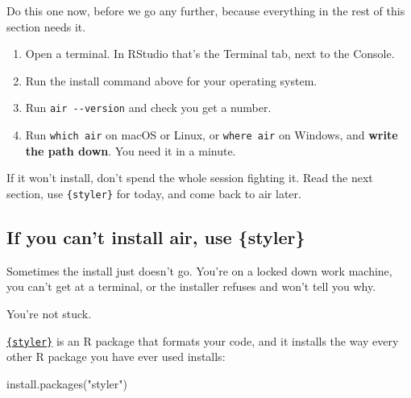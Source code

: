 \documentclass[
  letterpaper,
  justified,
  a4paper]{tufte-book}
\makeatletter
\newenvironment{Shaded}{\begin{snugshade}}{\end{snugshade}}
\newcommand{\FunctionTok}[1]{\textcolor[rgb]{0.28,0.35,0.67}{#1}}
\newcommand{\NormalTok}[1]{\textcolor[rgb]{0.00,0.23,0.31}{#1}}
\newcommand{\StringTok}[1]{\textcolor[rgb]{0.13,0.47,0.30}{#1}}
\providecommand{\tightlist}{%
  \setlength{\itemsep}{0pt}\setlength{\parskip}{0pt}}
\providecommand{\tightlist}{%
  \setlength{\itemsep}{0pt}\setlength{\parskip}{0pt}}
\let\rbporigShaded\Shaded
\let\rbporigendShaded\endShaded
\renewenvironment{Shaded}{%
  \begingroup
  \ifdim\linewidth=\rbpbodywidth
    \advance\linewidth by \@tufte@overhang
    \advance\hsize by \@tufte@overhang
    \advance\columnwidth by \@tufte@overhang
  \fi
  \rbporigShaded
}{%
  \rbporigendShaded
  \endgroup
}
\makeatother
\begin{document}
\begin{tcolorbox}[enhanced jigsaw, arc=.35mm, bottomrule=.15mm, bottomtitle=1mm, breakable, colback=white, colbacktitle=quarto-callout-note-color!10!white, colframe=quarto-callout-note-color-frame, coltitle=black, left=2mm, leftrule=.75mm, opacityback=0, opacitybacktitle=0.6, rightrule=.15mm, title=\textcolor{quarto-callout-note-color}{\faInfo}\hspace{0.5em}{Your Turn: install air}, titlerule=0mm, toprule=.15mm, toptitle=1mm]

Do this one now, before we go any further, because everything in the
rest of this section needs it.

\begin{enumerate}
\def\labelenumi{\arabic{enumi}.}
\tightlist
\item
  Open a terminal. In RStudio that's the Terminal tab, next to the
  Console.
\item
  Run the install command above for your operating system.
\item
  Run \texttt{air\ -\/-version} and check you get a number.
\item
  Run \texttt{which\ air} on macOS or Linux, or \texttt{where\ air} on
  Windows, and \textbf{write the path down}. You need it in a minute.
\end{enumerate}

If it won't install, don't spend the whole session fighting it. Read the
next section, use \texttt{\{styler\}} for today, and come back to air
later.

\end{tcolorbox}

\subsection{If you can't install air, use
\{styler\}}\label{if-you-cant-install-air-use-styler}

Sometimes the install just doesn't go. You're on a locked down work
machine, you can't get at a terminal, or the installer refuses and won't
tell you why.

You're not stuck.

\href{https://styler.r-lib.org/}{\texttt{\{styler\}}} is an R package
that formats your code, and it installs the way every other R package
you have ever used installs:

\begin{Shaded}
\begin{Highlighting}[]
\FunctionTok{install.packages}\NormalTok{(}\StringTok{"styler"}\NormalTok{)}
\end{Highlighting}
\end{Shaded}
\end{document}
